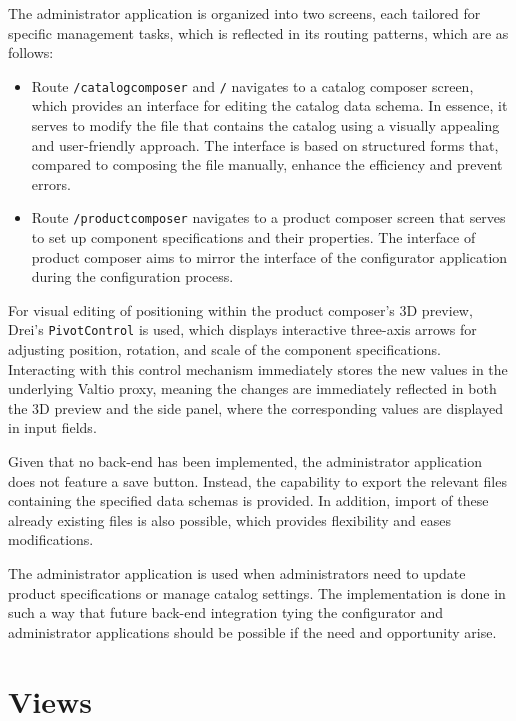 The administrator application is organized into two screens, each tailored for specific management tasks, which is reflected in its routing patterns, which are as follows:
\begin{itemize}[label=\rectanglebullet]
    \item Route \texttt{/catalogcomposer} and \texttt{/} navigates to a catalog composer screen, which provides an interface for editing the catalog data schema. In essence, it serves to modify the  file that contains the catalog using a visually appealing and user-friendly approach. The interface is based on structured forms that, compared to composing the file manually, enhance the efficiency and prevent errors. 
    
    \item Route \texttt{/productcomposer} navigates to a product composer screen that serves to set up component specifications and their properties. The interface of product composer aims to mirror the interface of the configurator application during the configuration process.
\end{itemize} 
    
For visual editing of positioning within the product composer's 3D preview, Drei's \texttt{PivotControl} is used, which displays interactive three-axis arrows for adjusting position, rotation, and scale of the component specifications. Interacting with this control mechanism immediately stores the new values in the underlying Valtio proxy, meaning the changes are immediately reflected in both the 3D preview and the side panel, where the corresponding values are displayed in input fields. 

Given that no back-end has been implemented, the administrator application does not feature a save button. Instead, the capability to export the relevant  files containing the specified data schemas is provided. In addition, import of these already existing files is also possible, which provides flexibility and eases modifications.

The administrator application is used when administrators need to update product specifications or manage catalog settings. The implementation is done in such a way that future back-end integration tying the configurator and administrator applications should be possible if the need and opportunity arise.


\section{Views}

